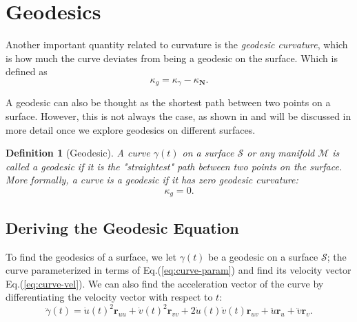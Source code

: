 \documentclass[12pt]{article}
\newtheorem{definition}{Definition}[section]
\begin{document}
\section{Geodesics}

Another important quantity related to curvature is the \emph{geodesic curvature}, which is how much the curve deviates from being a geodesic on the surface.
Which is defined as 
\begin{equation}\label{eq:geodesic-curvature}
	\kappa_{g} = \kappa_{\gamma} - \kappa_{\mathbf{N}}.
\end{equation}

A geodesic can also be thought as the shortest path between two points on a surface.
However, this is not always the case, as shown in \cite{jia2024geodesics} and will be discussed in more detail once we explore geodesics on different surfaces.

\begin{definition}[Geodesic]\label{def:geodesic}
	A curve $\gamma(t)$ on a surface $\mathcal{S}$ or any manifold $\mathcal{M}$ is called a \emph{geodesic} if it is the "straightest" path between two points on the surface.
	More formally, a curve is a geodesic if it has zero geodesic curvature:
	\[
	\kappa_{g} = 0.
	\]
\end{definition}

\subsection{Deriving the Geodesic Equation}

To find the geodesics of a surface, we let $\gamma(t)$ be a geodesic on a surface $\mathcal{S}$; the curve parameterized in terms of Eq.(\ref{eq:curve-param}) and find its velocity vector Eq.(\ref{eq:curve-vel}).
We can also find the acceleration vector of the curve by differentiating the velocity vector with respect to $t$:
\begin{equation}\label{eq:curve-acc}
	\ddot\gamma(t) = \dot{u}(t)^{2}\mathbf{r}_{uu} + \dot{v}(t)^{2}\mathbf{r}_{vv} + 2\dot{u}(t)\dot{v}(t)\mathbf{r}_{uv} + \ddot{u}\mathbf{r}_{u} + \ddot{v}\mathbf{r}_{v}.
\end{equation}
\end{document}
